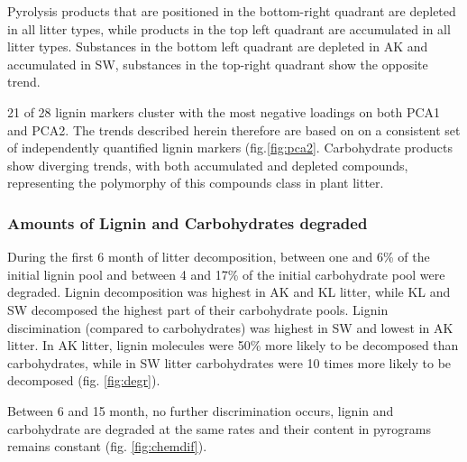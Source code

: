 \documentclass[authoryear,preprint,review,12pt]{elsarticle}
\begin{document}
Pyrolysis products that are positioned in the bottom-right quadrant are depleted in all litter types, while products in the top left quadrant are accumulated in all litter types. Substances in the bottom left quadrant are depleted in AK and accumulated in SW, substances in the top-right quadrant show the opposite trend.

21 of 28 lignin markers cluster with the most negative loadings on both PCA1 and PCA2. The trends described herein therefore are based on on a consistent set of independently quantified lignin  markers (fig.\ref{fig:pca2}. Carbohydrate products show diverging trends, with both accumulated and depleted compounds, representing the polymorphy of this compounds class in plant litter.

\subsubsection{Amounts of Lignin and Carbohydrates degraded}

During the first 6 month of litter decomposition, between one and 6\% of the initial lignin pool and between 4 and 17\% of the initial carbohydrate pool were degraded. Lignin decomposition was highest in AK and KL litter, while KL and SW decomposed the highest part of their carbohydrate pools. Lignin discimination (compared to carbohydrates) was highest in SW and lowest in AK litter. In AK litter, lignin molecules were 50\% more likely to be decomposed than carbohydrates, while in SW litter carbohydrates were 10 times more likely to be decomposed (fig. \ref{fig:degr}).

Between 6 and 15 month, no further discrimination occurs, lignin and carbohydrate are degraded at the same rates and their content in pyrograms remains constant (fig. \ref{fig:chemdif}).

\end{document}
